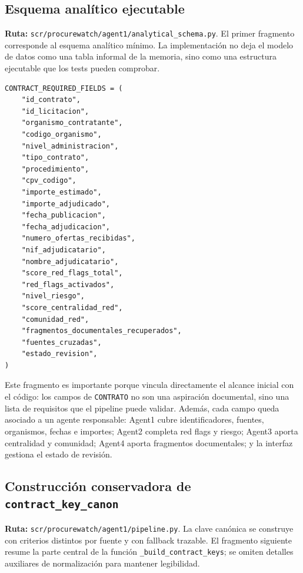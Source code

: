 \documentclass[11pt,a4paper,spanish]{book}
\numberwithin{equation}{chapter}
\numberwithin{figure}{chapter}
\begin{document}
\subsection{Esquema anal{\'i}tico ejecutable}

\textbf{Ruta:} \texttt{scr/procurewatch/agent1/analytical\_schema.py}. El primer fragmento
corresponde al esquema anal{\'i}tico m{\'i}nimo. La implementaci{\'o}n no deja el modelo de datos como
una tabla informal de la memoria, sino como una estructura ejecutable que los tests pueden
comprobar.

\begin{lstlisting}
CONTRACT_REQUIRED_FIELDS = (
    "id_contrato",
    "id_licitacion",
    "organismo_contratante",
    "codigo_organismo",
    "nivel_administracion",
    "tipo_contrato",
    "procedimiento",
    "cpv_codigo",
    "importe_estimado",
    "importe_adjudicado",
    "fecha_publicacion",
    "fecha_adjudicacion",
    "numero_ofertas_recibidas",
    "nif_adjudicatario",
    "nombre_adjudicatario",
    "score_red_flags_total",
    "red_flags_activados",
    "nivel_riesgo",
    "score_centralidad_red",
    "comunidad_red",
    "fragmentos_documentales_recuperados",
    "fuentes_cruzadas",
    "estado_revision",
)
\end{lstlisting}

Este fragmento es importante porque vincula directamente el alcance inicial con el c{\'o}digo:
los campos de \texttt{CONTRATO} no son una aspiraci{\'o}n documental, sino una lista de requisitos
que el pipeline puede validar. Adem{\'a}s, cada campo queda asociado a un agente responsable:
Agent1 cubre identificadores, fuentes, organismos, fechas e importes; Agent2 completa red flags y
riesgo; Agent3 aporta centralidad y comunidad; Agent4 aporta fragmentos documentales; y la interfaz
gestiona el estado de revisi{\'o}n.

\subsection{Construcci{\'o}n conservadora de \texttt{contract\_key\_canon}}

\textbf{Ruta:} \texttt{scr/procurewatch/agent1/pipeline.py}. La clave can{\'o}nica se construye con
criterios distintos por fuente y con fallback trazable. El fragmento siguiente resume la parte
central de la funci{\'o}n \texttt{\_build\_contract\_keys}; se omiten detalles auxiliares de
normalizaci{\'o}n para mantener legibilidad.
\end{document}
